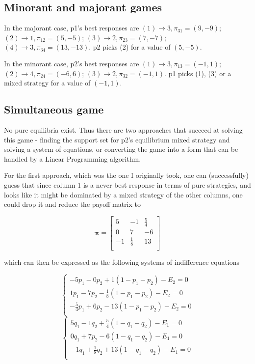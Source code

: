 \documentclass[12pt, a4paper]{article}
\begin{document}
\subsection{Minorant and majorant games}

In the majorant case, p1's best responses are $(1) \rightarrow 3, \pi_{31}=(9,-9)$; $(2) \rightarrow 1, \pi_{12}=(5,-5)$; $(3) \rightarrow 2, \pi_{23}=(7,-7)$; $(4) \rightarrow 3, \pi_{34}=(13,-13)$. p2 picks (2) for a value of $(5,-5)$.

In the minorant case, p2's best responses are $(1) \rightarrow 3, \pi_{13}=(-1,1)$; $(2) \rightarrow 4, \pi_{24}=(-6,6)$; $(3) \rightarrow 2, \pi_{32}=(-1,1)$. p1 picks (1), (3) or a mixed strategy for a value of $(-1,1)$.


\subsection{Simultaneous game}

No pure equilibria exist. Thus there are two approaches that succeed at solving this game - finding the support set for p2's equilibrium mixed strategy and solving a system of equations, or converting the game into a form that can be handled by a Linear Programming algorithm.


For the first approach, which was the one I originally took, one can (successfully) guess that since column 1 is a never best response in terms of pure strategies, and looks like it might be dominated by a mixed strategy of the other columns, one could drop it and reduce the payoff matrix to

\begin{equation}
    \boldsymbol{\pi}=\begin{bmatrix}
        5 & -1 & \frac{5}{4} \\
        0 & 7 & -6 \\
        -1 & \frac{1}{8} & 13 \\ 
    \end{bmatrix}
\end{equation}

which can then be expressed as the following systems of indifference equations

\begin{equation}
    \begin{cases}
        -5p_1-0p_2+1(1-p_1-p_2)-E_2=0 \\
        1p_1-7p_2-\frac{1}{8}(1-p_1-p_2)-E_2=0 \\
        -\frac{5}{4}p_1+6p_2-13(1-p_1-p_2)-E_2=0 \\
    \end{cases}
\end{equation}
\begin{equation}
    \begin{cases}
        5q_1-1q_2+\frac{5}{4}(1-q_1-q_2)-E_1=0 \\
        0q_1+7p_2-6(1-q_1-q_2)-E_1=0 \\
        -1q_1+\frac{1}{8}q_2+13(1-q_1-q_2)-E_1=0 \\
    \end{cases}
\end{equation}
\end{document}

